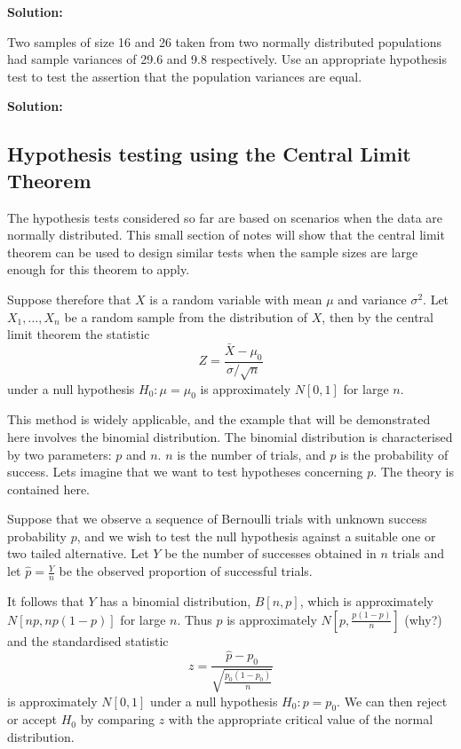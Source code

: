 \documentclass[12pt]{article}
\newenvironment{example}[1][Example:]{\begin{trivlist}
\item[\hskip \labelsep {\bfseries #1}]}{\end{trivlist}}
\begin{document}
\begin{mdframed}
\bf{Solution:}
\textcolor[rgb]{1.00,1.00,1.00}{\lipsum[1-4]}
\end{mdframed}

\begin{example}
Two samples of size 16 and 26 taken from two normally distributed populations had sample variances of 29.6 and 9.8 respectively. Use an appropriate hypothesis test to test the assertion that the population variances are equal.
\end{example}

\begin{mdframed}
\bf{Solution:}
\textcolor[rgb]{1.00,1.00,1.00}{\lipsum[1-4]}
\end{mdframed}


\subsection{Hypothesis testing using the Central Limit Theorem}

The hypothesis tests considered so far are based on scenarios when the data are normally distributed. This small section of notes will show that the central limit theorem can be used to design similar tests when the sample sizes are large enough for this theorem to apply.

Suppose therefore that $X$ is a random variable with mean $\mu$ and variance $\sigma^{2}$. Let $X_{1},\ldots,X_{n}$ be a random sample from the distribution of $X$, then by the central limit theorem the statistic $$Z=\frac{\bar{X}-\mu_{0}}{\sigma/\sqrt{n}}$$ under a null hypothesis $H_{0}:\mu=\mu_{0}$ is approximately $N[0,1]$ for large $n$.

This method is widely applicable, and the example that will be demonstrated here involves the binomial distribution. The binomial distribution is characterised by two parameters: $p$ and $n$. $n$ is the number of trials, and $p$ is the probability of success. Lets imagine that we want to test hypotheses concerning $p$. The theory is contained here.

Suppose that we observe a sequence of Bernoulli trials with unknown success probability $p$, and we wish to test the null hypothesis against a suitable one or two tailed alternative. Let $Y$ be the number of successes obtained in $n$ trials and let $\hat{p}=\frac{Y}{n}$ be the observed proportion of successful trials.

It follows that $Y$ has a binomial distribution, $B[n,p]$, which is approximately $N[np,np(1-p)]$ for large $n$. Thus $\hat{p}$ is approximately $N[p,\frac{p(1-p)}{n}]$ (why?) and the standardised statistic $$z=\frac{\hat{p}-p_0}{\sqrt{\frac{p_0(1-p_0)}{n}}}$$ is approximately $N[0,1]$ under a null hypothesis $H_{0}:p=p_0$. We can then reject or accept $H_{0}$ by comparing $z$ with the appropriate critical value of the normal distribution.
\end{document}
